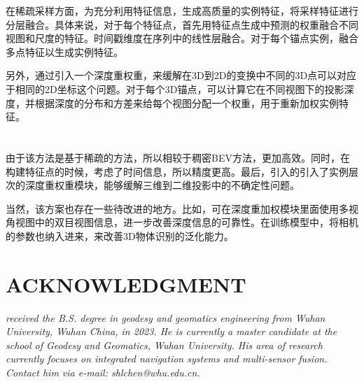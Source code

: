 \documentclass[12pt, twocolumn]{article}
\newcommand\normf{\fangsong}
\begin{document}
	在稀疏采样方面，为充分利用特征信息，生成高质量的实例特征，将采样特征进行分层融合。具体来说，对于每个特征点，首先用特征点生成中预测的权重融合不同视图和尺度的特征。时间戳维度在序列中的线性层融合。对于每个锚点实例，融合多点特征以生成实例特征。

	另外，通过引入一个深度重权重，来缓解在3D到2D的变换中不同的3D点可以对应于相同的2D坐标这个问题。对于每个3D锚点，可以计算它在不同视图下的投影深度，并根据深度的分布和方差来给每个视图分配一个权重，用于重新加权实例特征。

	\section{\normf{结论与展望}}
	由于该方法是基于稀疏的方法，所以相较于稠密BEV方法，更加高效。同时，在构建特征点的时候，考虑了时间信息，所以精度更高。最后，引入的引入了实例层次的深度重权重模块，能够缓解三维到二维投影中的不确定性问题。

	当然，该方案也存在一些待改进的地方。比如，可在深度重加权模块里面使用多视角视图中的双目视图信息，进一步改善深度信息的可靠性。在训练模型中，将相机的参数也纳入进来，来改善3D物体识别的泛化能力。
	
	
	
	
	\section*{ACKNOWLEDGMENT}
	\begin{tcolorbox}[colback=white,colframe=white!70!black,title={\bfseries Author Information}]
	\par\noindent
		\parbox[t]{\linewidth}{
	 \noindent{}
	 \emph{
	 received the B.S. degree in geodesy and geomatics engineering from Wuhan University, Wuhan China, in 2023.
	 He is currently a master candidate at the school of Geodesy and Geomatics, Wuhan University. His area of research currently focuses on integrated navigation systems and multi-sensor fusion.
	 Contact him via e-mail: shlchen@whu.edu.cn.
	 }}
	\end{tcolorbox}
		
		
\end{document}
